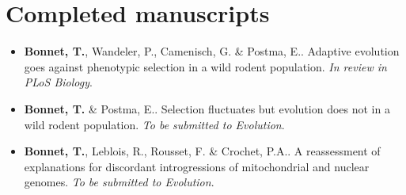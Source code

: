 \documentclass[a4paper,10pt]{article} %
\begin{document}
\section*{Completed manuscripts}
\vspace{10pt}
\begin{itemize}
\item \textbf{Bonnet, T.}, Wandeler, P., Camenisch, G. \& Postma, E.. Adaptive evolution goes against phenotypic selection in a wild rodent population. \textit{In review in PLoS Biology}.
\item \textbf{Bonnet, T.} \& Postma, E.. Selection fluctuates but evolution does not in a wild rodent population. \textit{To be submitted to Evolution}.
\item \textbf{Bonnet, T.}, Leblois, R., Rousset, F. \& Crochet, P.A.. A reassessment of explanations for discordant introgressions of mitochondrial and nuclear genomes. \textit{To be submitted to Evolution}.
\end{itemize}
\end{document}
